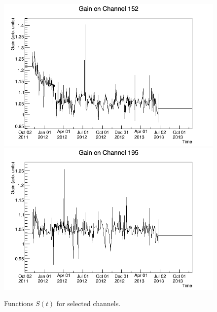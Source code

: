 \begin{figure}
\begin{center}
\includegraphics[keepaspectratio=true,width=\textwidth]{gainfunc_152.png}
\includegraphics[keepaspectratio=true,width=\textwidth]{gainfunc_195.png}
\end{center}
\renewcommand{\baselinestretch}{1}
\small\normalsize
\begin{quote}
\caption{Functions $S(t)$ for selected channels.}
\label{fig:LightmapGainFunc1}
\end{quote}
\end{figure}
\renewcommand{\baselinestretch}{2}
\small\normalsize

